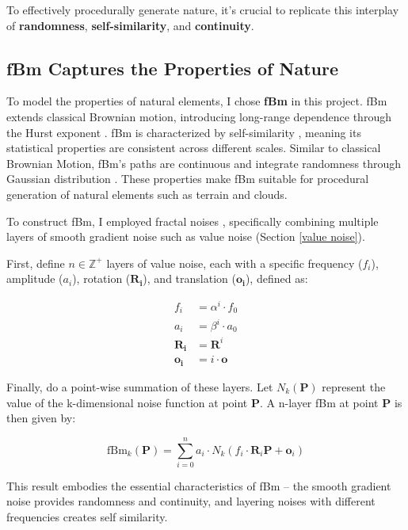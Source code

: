 To effectively procedurally generate nature, it's crucial to replicate this interplay of \textbf{randomness}, \textbf{self-similarity}, and \textbf{continuity}.

\subsection{fBm Captures the Properties of Nature}
\label{FBM}

To model the properties of natural elements, I chose \textbf{fBm} in this project. fBm extends classical Brownian motion, introducing long-range dependence through the Hurst exponent \cite{mandelbrot_fractional_1968}. fBm is characterized by self-similarity \cite{dieker_simulation_2004}, meaning its statistical properties are consistent across different scales. Similar to classical Brownian Motion, fBm's paths are continuous and integrate randomness through Gaussian distribution \cite{mandelbrot_fractional_1968}. These properties make fBm suitable for procedural generation of natural elements such as terrain and clouds.

To construct fBm, I employed fractal noises \cite{vivo_fractal_nodate}, specifically combining multiple layers of smooth gradient noise such as value noise (Section \ref{value noise}).

First, define $n \in \mathbb{Z}^+$ layers of value noise, each with a specific frequency ($f_i$), amplitude ($a_i$), rotation ($\mathbf{R_i}$), and translation ($\mathbf{o_i}$), defined as:

\begin{align}
f_i &= \alpha^i \cdot f_0 \\
a_{i} &= \beta^i \cdot a_{0}\\
\mathbf{R_i} &= \mathbf{R}^i \\
\mathbf{o_i} &= i\cdot\mathbf{o}
\end{align}

Finally, do a point-wise summation of these layers. Let $N_k(\mathbf{P})$ represent the value of the k-dimensional noise function at point $\mathbf{P}$. A n-layer fBm at point $\mathbf{P}$ is then given by:

\begin{equation}
    \text{fBm}_k(\mathbf{P}) = \sum_{i=0}^{n} a_i \cdot N_k(f_i \cdot \mathbf{R}_i\mathbf{P} + \mathbf{o}_i)
\end{equation}

This result embodies the essential characteristics of fBm -- the smooth gradient noise provides randomness and continuity, and layering noises with different frequencies creates self similarity.


